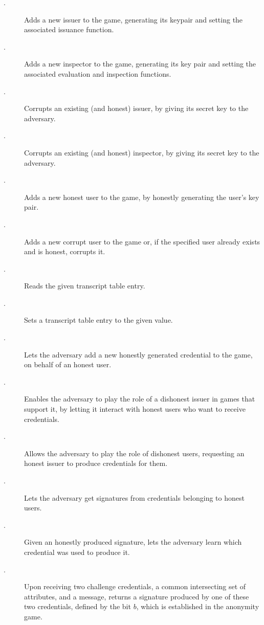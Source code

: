 \begin{description}
\item[\IGEN.] Adds a new issuer to the game, generating its keypair and setting
  the associated issuance function.
\item[\OGEN.] Adds a new inspector to the game, generating its key pair and
  setting the associated evaluation and inspection functions.
\item[\ICORR.] Corrupts an existing (and honest) issuer, by giving its secret
  key to the adversary.
\item[\OCORR.] Corrupts an existing (and honest) inspector, by giving its secret
  key to the adversary.  
\item[\HUGEN.] Adds a new honest user to the game, by honestly generating
  the user's key pair.
\item[\CUGEN.] Adds a new corrupt user to the game or, if the specified
  user already exists and is honest, corrupts it.
\item[\RREG.] Reads the given transcript table entry.
\item[\WREG.] Sets a transcript table entry to the given value.
\item[\OBTISS.] Lets the adversary add a new honestly generated credential to
  the game, on behalf of an honest user.
\item[\OBTAIN.] Enables the adversary to play the role of a dishonest issuer
  in games that support it, by letting it interact with honest users who want to
  receive credentials.
\item[\ISSUE.] Allows the adversary to play the role of dishonest users,
  requesting an honest issuer to produce credentials for them.
\item[\SIGN.] Lets the adversary get signatures from credentials belonging
  to honest users.
\item[\OPEN.] Given an honestly produced signature, lets the adversary learn
  which credential was used to produce it.
\item[\CHALb.] Upon receiving two challenge credentials, a common intersecting
  set of attributes, and a message, returns a signature produced by one of these
  two credentials, defined by the bit $b$, which is established in the anonymity
  game.
\end{description}

